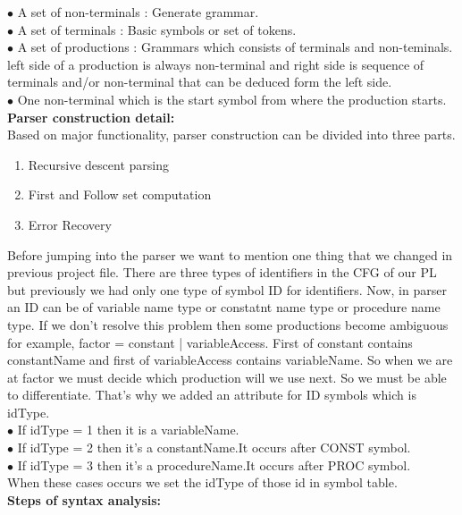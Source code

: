 \documentclass[paper=letter, fontsize=12pt]{scrartcl} %
\begin{document}
$\bullet$ A set of non-terminals : Generate grammar.\\
$\bullet$ A set of terminals : Basic symbols or set of tokens.\\
$\bullet$ A set of productions : Grammars which consists of terminals and non-teminals. left side of a production is always non-terminal and right side is sequence of terminals and/or non-terminal that can be deduced form the left side.\\
$\bullet$ One non-terminal which is the start symbol from where the production starts.\\


{\bf Parser construction detail:}\\

Based on major functionality, parser construction can be divided into three parts.
\begin{enumerate}  
\item Recursive descent parsing 
\item First and Follow set computation
\item Error Recovery
\end{enumerate}

Before jumping into the parser we want to mention one thing that we changed in previous project file. There are three types of identifiers in the CFG of our PL but previously we had only one type of symbol ID for identifiers. Now, in parser an ID can be of variable name type or constatnt name type or procedure name type. If we don't resolve this problem then some productions become ambiguous for example, factor = constant | variableAccess. First of constant contains constantName and first of variableAccess contains variableName. So when we are at factor we must decide which production will we use next. So we must be able to differentiate. That's why we added an attribute for ID symbols which is idType.\\

$\bullet$ If idType = 1 then it is a variableName.\\ 
$\bullet$ If idType = 2	then it's a constantName.It occurs after CONST symbol.\\
$\bullet$ If idType = 3 then it's a procedureName.It occurs after PROC symbol. \\ 

When these cases occurs we set the idType of those id in symbol table.\\

\pagebreak
{\bf Steps of syntax analysis:}\\
\end{document}
